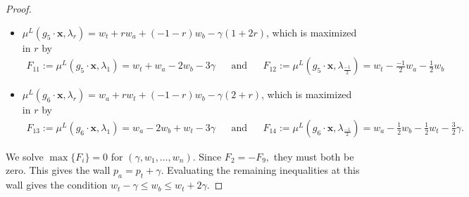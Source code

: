 \documentclass{amsart}
\numberwithin{equation}{section}
\theoremstyle{definition}
\begin{document}
\begin{proof}
\begin{itemize}
    
    \item $\mu^L(g_5 \cdot \mathbf{x}, \lambda_r) = w_t + rw_a + (-1-r)w_b - \gamma(1+2r)$, which is maximized in $r$ by
    \begin{align*}
        F_{11} := \mu^L(g_5 \cdot \mathbf{x}, \lambda_1) = w_t + w_a - 2w_b -3\gamma
        && \text{and} &&
        F_{12} := \mu^L(g_5 \cdot \mathbf{x}, \lambda_{\frac{-1}{2}}) = w_t - \frac{-1}{2}w_a - \frac{1}{2}w_b
    \end{align*}
    
    \item $\mu^L(g_6 \cdot \mathbf{x}, \lambda_r) = w_a + rw_t + (-1-r)w_b - \gamma(2+r)$, which is maximized in $r$ by
    \begin{align*}
        F_{13} := \mu^L(g_6 \cdot \mathbf{x}, \lambda_1) = w_a -2w_b + w_t - 3\gamma
        && \text{and} &&
        F_{14} := \mu^L(g_6 \cdot \mathbf{x}, \lambda_{\frac{-1}{2}}) = w_a - \frac{1}{2}w_b - \frac{1}{2}w_t - \frac{3}{2}\gamma.
    \end{align*}
\end{itemize}
We solve $\max \{F_i\} =0$ for $(\gamma, w_1, \dots , w_n)$. Since $F_2 = -F_9,$ they must both be zero. This gives the wall $p_a = p_t + \gamma.$ Evaluating the remaining inequalities at this wall gives the condition $w_t - \gamma \leq w_b \leq w_t +2 \gamma.$










\end{proof}
\end{document}
